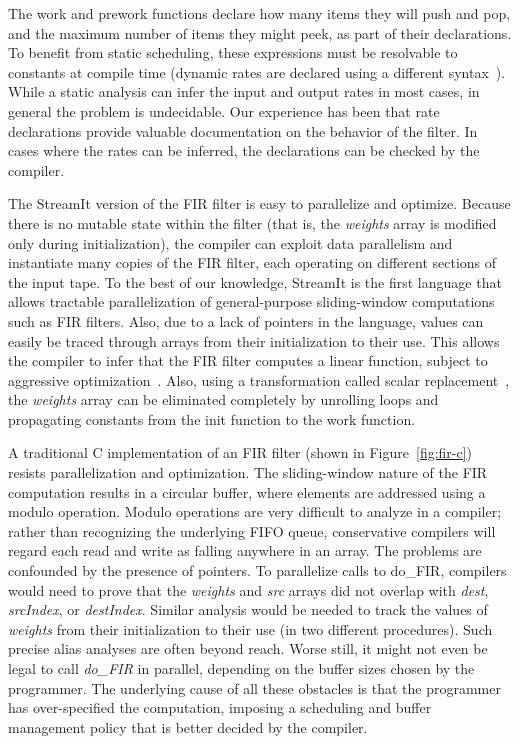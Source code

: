 The work and prework functions declare how many items they will push
and pop, and the maximum number of items they might peek, as part of
their declarations.  To benefit from static scheduling, these
expressions must be resolvable to constants at compile time (dynamic
rates are declared using a different
syntax~\cite{streamit-lang-spec}). While a static analysis can infer
the input and output rates in most cases, in general the problem is
undecidable.  Our experience has been that rate declarations provide
valuable documentation on the behavior of the filter.  In cases where
the rates can be inferred, the declarations can be checked by the
compiler.

The StreamIt version of the FIR filter is easy to parallelize and
optimize.  Because there is no mutable state within the filter (that
is, the {\it weights} array is modified only during initialization),
the compiler can exploit data parallelism and instantiate many copies
of the FIR filter, each operating on different sections of the input
tape.  To the best of our knowledge, StreamIt is the first language
that allows tractable parallelization of general-purpose
sliding-window computations such as FIR filters.  Also, due to a lack
of pointers in the language, values can easily be traced through
arrays from their initialization to their use.  This allows the
compiler to infer that the FIR filter computes a linear function,
subject to aggressive optimization~\cite{lamb-pldi03}.  Also,
using a transformation called scalar
replacement~\cite{sermulins-lctes05}, the {\it weights} array can
be eliminated completely by unrolling loops and propagating constants
from the init function to the work function.

A traditional C implementation of an FIR filter (shown in
Figure~\ref{fig:fir-c}) resists parallelization and optimization.  The
sliding-window nature of the FIR computation results in a circular
buffer, where elements are addressed using a modulo operation.  Modulo
operations are very difficult to analyze in a compiler; rather than
recognizing the underlying FIFO queue, conservative compilers will
regard each read and write as falling anywhere in an array.  The
problems are confounded by the presence of pointers.  To parallelize
calls to do\_FIR, compilers would need to prove that the {\it weights}
and {\it src} arrays did not overlap with {\it dest}, {\it srcIndex},
or {\it destIndex}.  Similar analysis would be needed to track the
values of {\it weights} from their initialization to their use (in two
different procedures).  Such precise alias analyses are often beyond
reach.  Worse still, it might not even be legal to call {\it do\_FIR}
in parallel, depending on the buffer sizes chosen by the programmer.
The underlying cause of all these obstacles is that the programmer has
over-specified the computation, imposing a scheduling and buffer
management policy that is better decided by the compiler.

